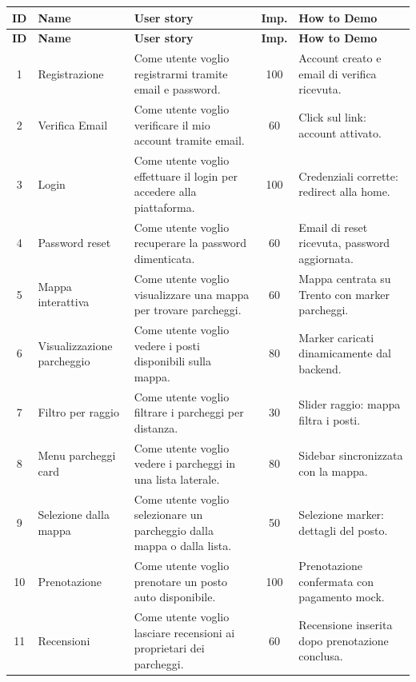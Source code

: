 \documentclass[a4paper,12pt]{article}
\begin{document}
\begin{longtable}{|c|l|p{4.5cm}|c|p{3cm}|}
\hline
\textbf{ID} & \textbf{Name} & \textbf{User story} & \textbf{Imp.} & \textbf{How to Demo} \\
\hline
\endfirsthead
\hline
\textbf{ID} & \textbf{Name} & \textbf{User story} & \textbf{Imp.} & \textbf{How to Demo} \\
\hline
\endhead
1  & Registrazione         & Come utente voglio registrarmi tramite email e password.                                    & 100 & Account creato e email di verifica ricevuta. \\
\hline
2  & Verifica Email        & Come utente voglio verificare il mio account tramite email.                                & 60  & Click sul link: account attivato. \\
\hline
3  & Login                 & Come utente voglio effettuare il login per accedere alla piattaforma.                      & 100 & Credenziali corrette: redirect alla home. \\
\hline
4  & Password reset        & Come utente voglio recuperare la password dimenticata.                                     & 60  & Email di reset ricevuta, password aggiornata. \\
\hline
5  & Mappa interattiva     & Come utente voglio visualizzare una mappa per trovare parcheggi.                           & 60  & Mappa centrata su Trento con marker parcheggi. \\
\hline
6  & Visualizzazione parcheggio & Come utente voglio vedere i posti disponibili sulla mappa.                            & 80  & Marker caricati dinamicamente dal backend. \\
\hline
7  & Filtro per raggio     & Come utente voglio filtrare i parcheggi per distanza.                                      & 30  & Slider raggio: mappa filtra i posti. \\
\hline
8  & Menu parcheggi card   & Come utente voglio vedere i parcheggi in una lista laterale.                               & 80  & Sidebar sincronizzata con la mappa. \\
\hline
9  & Selezione dalla mappa & Come utente voglio selezionare un parcheggio dalla mappa o dalla lista.                    & 50  & Selezione marker: dettagli del posto. \\
\hline
10 & Prenotazione          & Come utente voglio prenotare un posto auto disponibile.                                    & 100 & Prenotazione confermata con pagamento mock. \\
\hline
11 & Recensioni            & Come utente voglio lasciare recensioni ai proprietari dei parcheggi.                       & 60  & Recensione inserita dopo prenotazione conclusa. \\

\end{longtable}
\end{document}
